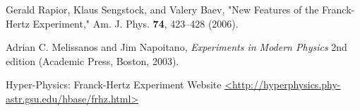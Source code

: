 \documentclass[prb,preprint]{revtex4-1}
\begin{document}
\begin{thebibliography}{9}


 Gerald Rapior, Klaus Sengstock, and Valery Baev, "New Features of the Franck-Hertz Experiment,"  Am. J. Phys. \textbf{74}, 423--428 (2006). 

 Adrian C. Melissanos and Jim Napoitano, \textit{Experiments in Modern Physics} 2nd edition (Academic Press, Boston, 2003).

 Hyper-Physics: Franck-Hertz Experiment Website \url{<http://hyperphysics.phy-astr.gsu.edu/hbase/frhz.html>}

\end{thebibliography}
\end{document}
